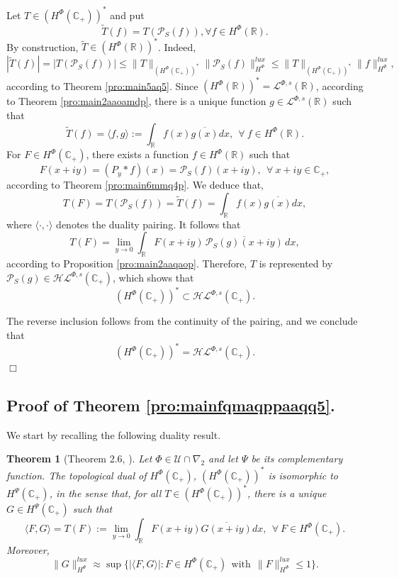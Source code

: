 \documentclass[a4paper,12pt,intlimits,oneside]{amsart}
\newtheorem{theorem}{Theorem}[section]
\theoremstyle{definition}
\numberwithin{equation}{section}
\newcommand{\epf}{ $\Box$\medskip}
\theoremstyle{definition}
\begin{document}
Let   $T\in \left(H^{\Phi}(\mathbb{C}_{+})\right)^{*}$ and put    
 $$ \widetilde{T}(f)= T(\mathcal{P}_S(f)), \forall f \in H^{\Phi}(\mathbb{R}).    $$
By construction, $\widetilde{T}\in \left(H^{\Phi}(\mathbb{R})\right)^{*}$. Indeed,  
$$ | \widetilde{T}(f) | = | T(\mathcal{P}_S(f))| \leq \|T\|_{\left(H^{\Phi}(\mathbb{C}_{+})\right)^{*}} \|\mathcal{P}_S(f)\|_{H^{\Phi}}^{lux} \leq \|T\|_{\left(H^{\Phi}(\mathbb{C}_{+})\right)^{*}}\|f\|_{H^{\Phi}}^{lux},  $$
according to Theorem \ref{pro:main5aq5}. Since $\left(H^{\Phi}(\mathbb{R})\right)^{*}= \mathcal{L}^{\Phi,s}(\mathbb{R})$, according to Theorem \ref{pro:main2aaoamdp}, there is a unique function $ g\in \mathcal{L}^{\Phi,s}(\mathbb{R})$ such that $$ \widetilde{T}(f)= \langle f , g \rangle := \int_{\mathbb{R}}f(x)\overline{g(x)}dx, ~~ \forall~f\in H^{\Phi}(\mathbb{R}).   $$
For  $F\in H^{\Phi}(\mathbb{C}_{+})$, there exists a  function $f \in H^{\Phi}(\mathbb{R})$ such that  $$   F(x+iy)=(P_y * f)(x)=\mathcal{P}_S(f)(x+iy), ~~ \forall~ x+iy \in \mathbb{C}_{+},   $$
according to Theorem \ref{pro:main6mmq4p}.  We deduce that,
$$  T(F) = T(\mathcal{P}_S(f))= \widetilde{T}(f)=\int_{\mathbb{R}}f(x)\overline{g(x)}dx,   $$
where $\langle \cdot , \cdot \rangle$ denotes the duality pairing. It follows that
$$  T(F) = \lim_{y \to 0} \int_{\mathbb{R}} F(x+iy)\,\overline{\mathcal{P}_S(g)(x+iy)}\,dx,   $$
according to Proposition \ref{pro:main2aaqaop}. 
Therefore, $T$ is represented by $\mathcal{P}_S(g) \in \mathcal{H}\mathcal{L}^{\Phi,s}(\mathbb{C}_{+})$, which shows that
\[
\left(H^{\Phi}(\mathbb{C}_{+})\right)^{*}
\subset \mathcal{H}\mathcal{L}^{\Phi,s}(\mathbb{C}_{+}).
\]

The reverse inclusion follows from the continuity of the pairing, and we conclude that
\[
\left(H^{\Phi}(\mathbb{C}_{+})\right)^{*}
= \mathcal{H}\mathcal{L}^{\Phi,s}(\mathbb{C}_{+}).
\]
\epf



\subsection{Proof of  Theorem \ref{pro:mainfqmaqppaaqq5}.} 

We start by recalling the following duality result.
\begin{theorem}[Theorem 2.6, \cite{djefeuto}]\label{pro:main 5aqk3pl}
Let $\Phi \in \mathscr{U} \cap \nabla_{2}$ and let $\Psi$ be its complementary function. The topological dual of $H^{\Phi}(\mathbb{C}_{+})$,   $\left(H^{\Phi}(\mathbb{C}_{+})\right)^{*}$    is isomorphic to $H^{\Psi}(\mathbb{C}_{+})$, in the sense that, for all  $T\in \left(H^{\Phi}(\mathbb{C}_{+})\right)^{*}$, there is a unique $G\in H^{\Psi}(\mathbb{C}_{+})$ such that
 $$   \langle F,G  \rangle =T(F) := \lim_{y\to 0}\int_{\mathbb{R}}F(x+iy)\overline{G(x+iy)}dx, ~~ \forall~F\in H^{\Phi}(\mathbb{C}_{+}). 
   $$
Moreover,    
$$  \|G\|_{H^{\Psi}}^{lux} \approx \sup\{ |\langle F,G  \rangle| : F\in H^{\Phi}(\mathbb{C}_{+})~~ \text{with}~~\|F\|_{H^{\Phi}}^{lux} \leq 1 \}. $$   
\end{theorem}
\end{document}
